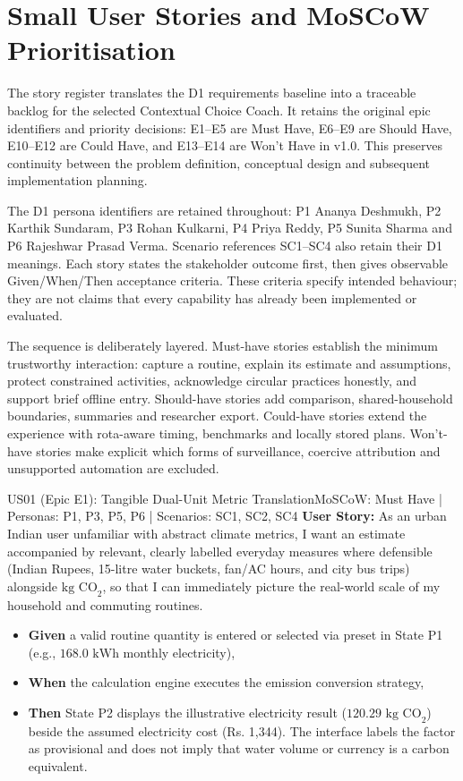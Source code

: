 \documentclass[12pt,a4paper]{article}
\begin{document}
\section{Small User Stories and MoSCoW Prioritisation}

The story register translates the D1 requirements baseline into a traceable backlog for the selected Contextual Choice Coach. It retains the original epic identifiers and priority decisions: E1--E5 are Must Have, E6--E9 are Should Have, E10--E12 are Could Have, and E13--E14 are Won't Have in v1.0. This preserves continuity between the problem definition, conceptual design and subsequent implementation planning.

The D1 persona identifiers are retained throughout: P1 Ananya Deshmukh, P2 Karthik Sundaram, P3 Rohan Kulkarni, P4 Priya Reddy, P5 Sunita Sharma and P6 Rajeshwar Prasad Verma. Scenario references SC1--SC4 also retain their D1 meanings. Each story states the stakeholder outcome first, then gives observable Given/When/Then acceptance criteria. These criteria specify intended behaviour; they are not claims that every capability has already been implemented or evaluated.

The sequence is deliberately layered. Must-have stories establish the minimum trustworthy interaction: capture a routine, explain its estimate and assumptions, protect constrained activities, acknowledge circular practices honestly, and support brief offline entry. Should-have stories add comparison, shared-household boundaries, summaries and researcher export. Could-have stories extend the experience with rota-aware timing, benchmarks and locally stored plans. Won't-have stories make explicit which forms of surveillance, coercive attribution and unsupported automation are excluded.

\begin{storybox}{US01 (Epic E1): Tangible Dual-Unit Metric Translation}{MoSCoW: Must Have | Personas: P1, P3, P5, P6 | Scenarios: SC1, SC2, SC4}
\textbf{User Story:} As an urban Indian user unfamiliar with abstract climate metrics, I want an estimate accompanied by relevant, clearly labelled everyday measures where defensible (Indian Rupees, 15-litre water buckets, fan/AC hours, and city bus trips) alongside $\text{kg CO}_2$, so that I can immediately picture the real-world scale of my household and commuting routines.
\begin{itemize}
    \item \textbf{Given} a valid routine quantity is entered or selected via preset in State P1 (e.g., $168.0\text{ kWh}$ monthly electricity),
    \item \textbf{When} the calculation engine executes the emission conversion strategy,
    \item \textbf{Then} State P2 displays the illustrative electricity result ($120.29\text{ kg CO}_2$) beside the assumed electricity cost (Rs. 1,344). The interface labels the factor as provisional and does not imply that water volume or currency is a carbon equivalent.
\end{itemize}
\end{storybox}
\end{document}
